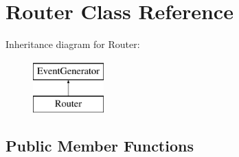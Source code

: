 \hypertarget{classRouter}{\section{\-Router \-Class \-Reference}
\label{classRouter}
}
\-Inheritance diagram for \-Router\-:\begin{figure}[H]
\begin{center}
\leavevmode
\includegraphics[height=2.000000cm]{classRouter}
\end{center}
\end{figure}
\subsection*{\-Public \-Member \-Functions}
